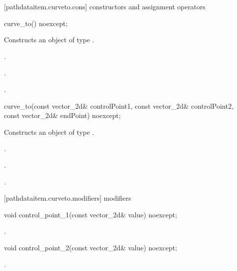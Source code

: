  [pathdataitem.curveto.cons] { constructors and assignment operators}

\begin{itemdecl}
    curve_to() noexcept;
\end{itemdecl}
\begin{itemdescr}
	\pnum
	\effects
	Constructs an object of type .
	
	\pnum
	\postconditions
	.

	.

	.

\end{itemdescr}

\begin{itemdecl}
    curve_to(const vector_2d& controlPoint1, const vector_2d& controlPoint2,
      const vector_2d& endPoint) noexcept;
\end{itemdecl}
\begin{itemdescr}
	\pnum
	\effects
	Constructs an object of type .
	
	\pnum
	\postconditions
	.

	.

	.

\end{itemdescr}

 [pathdataitem.curveto.modifiers]{ modifiers}

\begin{itemdecl}
    void control_point_1(const vector_2d& value) noexcept;
\end{itemdecl}
\begin{itemdescr}
	\pnum
	\postconditions
	.
	
\end{itemdescr}

\begin{itemdecl}
    void control_point_2(const vector_2d& value) noexcept;
\end{itemdecl}
\begin{itemdescr}
	\pnum
	\postconditions
	.
	
\end{itemdescr}

